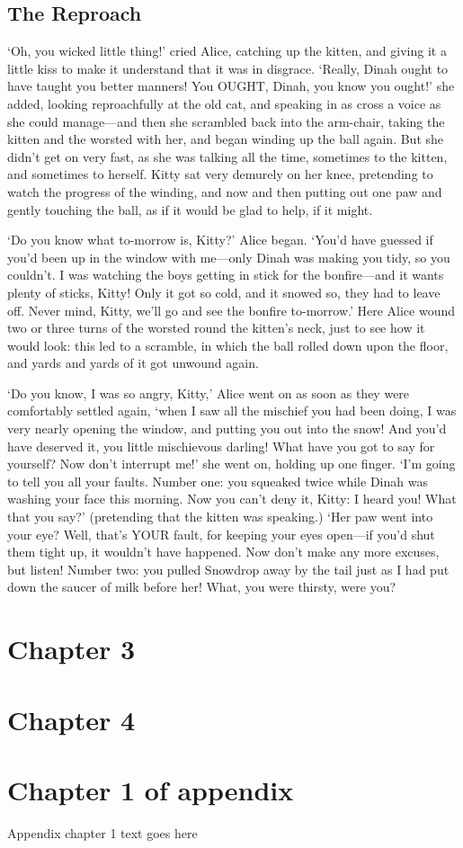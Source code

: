 \documentclass[phd,tocprelim]{cornell}
\begin{document}
\section{The Reproach}

  `Oh, you wicked little thing!' cried Alice, catching up the
kitten, and giving it a little kiss to make it understand that it
was in disgrace.  `Really, Dinah ought to have taught you better
manners!  You OUGHT, Dinah, you know you ought!' she added,
looking reproachfully at the old cat, and speaking in as cross a
voice as she could manage---and then she scrambled back into the
arm-chair, taking the kitten and the worsted with her, and began
winding up the ball again.  But she didn't get on very fast, as
she was talking all the time, sometimes to the kitten, and
sometimes to herself.  Kitty sat very demurely on her knee,
pretending to watch the progress of the winding, and now and then
putting out one paw and gently touching the ball, as if it would
be glad to help, if it might.

  `Do you know what to-morrow is, Kitty?' Alice began.  `You'd
have guessed if you'd been up in the window with me---only Dinah
was making you tidy, so you couldn't.  I was watching the boys
getting in stick for the bonfire---and it wants plenty of
sticks, Kitty!  Only it got so cold, and it snowed so, they had
to leave off.  Never mind, Kitty, we'll go and see the bonfire
to-morrow.'  Here Alice wound two or three turns of the worsted
round the kitten's neck, just to see how it would look:  this led
to a scramble, in which the ball rolled down upon the floor, and
yards and yards of it got unwound again.

  `Do you know, I was so angry, Kitty,' Alice went on as soon as
they were comfortably settled again, `when I saw all the mischief
you had been doing, I was very nearly opening the window, and
putting you out into the snow!  And you'd have deserved it, you
little mischievous darling!  What have you got to say for
yourself?  Now don't interrupt me!' she went on, holding up one
finger.  `I'm going to tell you all your faults.  Number one:
you squeaked twice while Dinah was washing your face this
morning.  Now you can't deny it, Kitty:  I heard you!  What that
you say?' (pretending that the kitten was speaking.)  `Her paw
went into your eye?  Well, that's YOUR fault, for keeping your
eyes open---if you'd shut them tight up, it wouldn't have
happened.  Now don't make any more excuses, but listen!  Number
two:  you pulled Snowdrop away by the tail just as I had put down
the saucer of milk before her!  What, you were thirsty, were you?

\chapter{Chapter 3}

\chapter{Chapter 4}

\appendix
\chapter{Chapter 1 of appendix}
Appendix chapter 1 text goes here


\end{document}
